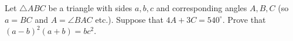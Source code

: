 Let $\triangle ABC$ be a triangle with sides $a, b, c$ and corresponding angles
$A, B, C$ (so $a = BC$ and $A = \angle BAC$ etc.). Suppose that $4A + 3C =
540^\circ$. Prove that $(a - b)^2 (a + b) = b c^2$.

